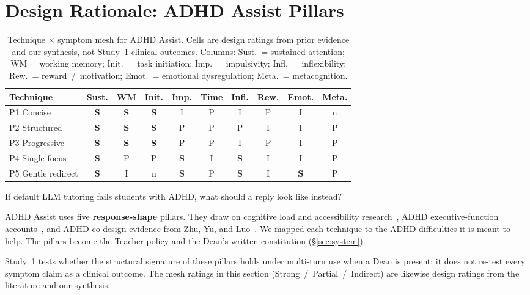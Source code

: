 \section{Design Rationale: ADHD Assist Pillars}
\label{sec:design}

\begin{table}[t!]
\caption{Technique $\times$ symptom mesh for ADHD Assist. Cells are design
ratings from prior evidence and our synthesis, not Study~1 clinical outcomes.
Columns: Sust.\ = sustained attention; WM = working memory; Init.\ = task
initiation; Imp.\ = impulsivity; Infl.\ = inflexibility; Rew.\ =
reward~/~motivation; Emot.\ = emotional dysregulation; Meta.\ = metacognition.}
\label{tab:mesh}
\centering
\footnotesize
\setlength{\tabcolsep}{4.5pt}
\begin{tabular}{l*{9}{c}}
\toprule
Technique & Sust. & WM & Init. & Imp. & Time & Infl. & Rew. & Emot. & Meta. \\
\midrule
P1 Concise & \textbf{S} & \textbf{S} & \textbf{S} & I & P & I & P & I & n \\
P2 Structured & \textbf{S} & \textbf{S} & \textbf{S} & P & P & P & I & I & P \\
P3 Progressive & \textbf{S} & \textbf{S} & \textbf{S} & P & P & I & P & I & P \\
P4 Single-focus & \textbf{S} & P & P & \textbf{S} & I & \textbf{S} & I & I & P \\
P5 Gentle redirect & \textbf{S} & I & n & \textbf{S} & P & \textbf{S} & I & \textbf{S} & P \\
\bottomrule
\end{tabular}
\end{table}

If default LLM tutoring fails students with ADHD, what should a reply look
like instead?

ADHD Assist uses five \textbf{response-shape} pillars. They draw on cognitive
load and accessibility research~\cite{sweller2011cognitive,cowan2010magical,w3c2021coga},
ADHD executive-function accounts~\cite{barkley1997behavioral}, and ADHD
co-design evidence from Zhu, Yu, and Luo~\cite{zhu2026scaffolding}. We mapped
each technique to the ADHD difficulties it is meant to help. The pillars
become the Teacher policy and the Dean's written constitution
(\S\ref{sec:system}).

Study~1 tests whether the structural signature of these pillars holds under
multi-turn use when a Dean is present; it does not re-test every symptom
claim as a clinical outcome. The mesh ratings in this section
(Strong~/~Partial~/~Indirect) are likewise design ratings from the literature
and our synthesis.

